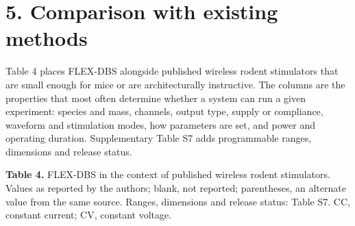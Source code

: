 \section{5. Comparison with existing methods}\label{comparison-with-existing-methods}

Table 4 places FLEX-DBS alongside published wireless rodent stimulators that are small enough for mice or are architecturally instructive. The columns are the properties that most often determine whether a system can run a given experiment: species and mass, channels, output type, supply or compliance, waveform and stimulation modes, how parameters are set, and power and operating duration. Supplementary Table S7 adds programmable ranges, dimensions and release status.

\begin{landscape}
\textbf{Table 4.} FLEX-DBS in the context of published wireless rodent stimulators. Values as reported by the authors; blank, not reported; parentheses, an alternate value from the same source. Ranges, dimensions and release status: Table S7. CC, constant current; CV, constant voltage.


\end{landscape}
